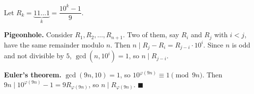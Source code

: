 Let $R_k=\underbrace{11\ldots1}_{k}=\dfrac{10^k-1}{9}$.

\textbf{Pigeonhole.} Consider $R_1,R_2,\dots,R_{n+1}$. Two of them, say $R_i$ and $R_j$ with $i<j$, have the same remainder modulo $n$. Then $n\mid R_j-R_i=R_{j-i}\cdot10^i$. Since $n$ is odd and not divisible by $5$, $\gcd(n,10^i)=1$, so $n\mid R_{j-i}$.

\textbf{Euler's theorem.} $\gcd(9n,10)=1$, so $10^{\varphi(9n)}\equiv1\pmod{9n}$. Then $9n\mid10^{\varphi(9n)}-1=9R_{\varphi(9n)}$, so $n\mid R_{\varphi(9n)}$. $\blacksquare$
